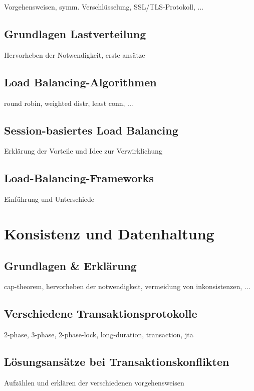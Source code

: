 \documentclass[letterpaper, 12pt]{article}
\let\tempsection\section
\renewcommand\section[1]{\vspace{-0.3cm}\tempsection{#1}\vspace{-0.3cm}}
\let\tempsubsection\subsection
\renewcommand\subsection[1]{\vspace{0cm}\tempsubsection{#1}\vspace{0cm}}
\begin{document}
Vorgehensweisen, symm. Verschlüsselung, SSL/TLS-Protokoll, ...

\subsection{Grundlagen Lastverteilung}

Hervorheben der Notwendigkeit, erste ansätze

\subsection{Load Balancing-Algorithmen}

round robin, weighted distr, least conn, ...

\subsection{Session-basiertes Load Balancing}

Erklärung der Vorteile und Idee zur Verwirklichung

\subsection{Load-Balancing-Frameworks}

Einführung und Unterschiede

\clearpage

\section{Konsistenz und Datenhaltung}

\subsection{Grundlagen \& Erklärung}

cap-theorem, hervorheben der notwendigkeit, vermeidung von inkonsistenzen, ...

\subsection{Verschiedene Transaktionsprotokolle}

2-phase, 3-phase, 2-phase-lock, long-duration, transaction, jta

\subsection{Lösungsansätze bei Transaktionskonflikten}

Aufzählen und erklären der verschiedenen vorgehensweisen

\clearpage

\clearpage


\lstlistoflistings
\listoffigures
\end{document}
